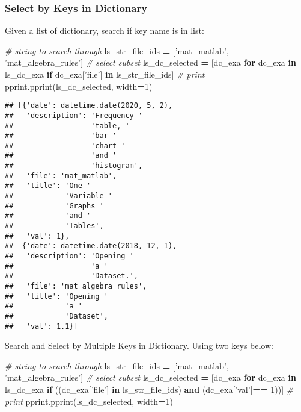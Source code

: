 \documentclass[
]{book}
\newenvironment{Shaded}{\begin{snugshade}}{\end{snugshade}}
\newcommand{\CommentTok}[1]{\textcolor[rgb]{0.56,0.35,0.01}{\textit{#1}}}
\newcommand{\ControlFlowTok}[1]{\textcolor[rgb]{0.13,0.29,0.53}{\textbf{#1}}}
\newcommand{\DecValTok}[1]{\textcolor[rgb]{0.00,0.00,0.81}{#1}}
\newcommand{\KeywordTok}[1]{\textcolor[rgb]{0.13,0.29,0.53}{\textbf{#1}}}
\newcommand{\NormalTok}[1]{#1}
\newcommand{\OperatorTok}[1]{\textcolor[rgb]{0.81,0.36,0.00}{\textbf{#1}}}
\newcommand{\StringTok}[1]{\textcolor[rgb]{0.31,0.60,0.02}{#1}}
\begin{document}
\hypertarget{select-by-keys-in-dictionary}{%
\subsubsection{Select by Keys in Dictionary}\label{select-by-keys-in-dictionary}}

Given a list of dictionary, search if key name is in list:

\begin{Shaded}
\begin{Highlighting}[]
\CommentTok{# string to search through}
\NormalTok{ls_str_file_ids }\OperatorTok{=}\NormalTok{ [}\StringTok{'mat_matlab'}\NormalTok{, }\StringTok{'mat_algebra_rules'}\NormalTok{]}
\CommentTok{# select subset}
\NormalTok{ls_dc_selected }\OperatorTok{=}\NormalTok{ [dc_exa}
                  \ControlFlowTok{for}\NormalTok{ dc_exa }\KeywordTok{in}\NormalTok{ ls_dc_exa}
                  \ControlFlowTok{if}\NormalTok{ dc_exa[}\StringTok{'file'}\NormalTok{] }\KeywordTok{in}\NormalTok{ ls_str_file_ids]}
\CommentTok{# print}
\NormalTok{pprint.pprint(ls_dc_selected, width}\OperatorTok{=}\DecValTok{1}\NormalTok{)}
\end{Highlighting}
\end{Shaded}

\begin{verbatim}
## [{'date': datetime.date(2020, 5, 2),
##   'description': 'Frequency '
##                  'table, '
##                  'bar '
##                  'chart '
##                  'and '
##                  'histogram',
##   'file': 'mat_matlab',
##   'title': 'One '
##            'Variable '
##            'Graphs '
##            'and '
##            'Tables',
##   'val': 1},
##  {'date': datetime.date(2018, 12, 1),
##   'description': 'Opening '
##                  'a '
##                  'Dataset.',
##   'file': 'mat_algebra_rules',
##   'title': 'Opening '
##            'a '
##            'Dataset',
##   'val': 1.1}]
\end{verbatim}

Search and Select by Multiple Keys in Dictionary. Using two keys below:

\begin{Shaded}
\begin{Highlighting}[]
\CommentTok{# string to search through}
\NormalTok{ls_str_file_ids }\OperatorTok{=}\NormalTok{ [}\StringTok{'mat_matlab'}\NormalTok{, }\StringTok{'mat_algebra_rules'}\NormalTok{]}
\CommentTok{# select subset}
\NormalTok{ls_dc_selected }\OperatorTok{=}\NormalTok{ [dc_exa}
                  \ControlFlowTok{for}\NormalTok{ dc_exa }\KeywordTok{in}\NormalTok{ ls_dc_exa}
                  \ControlFlowTok{if}\NormalTok{ ((dc_exa[}\StringTok{'file'}\NormalTok{] }\KeywordTok{in}\NormalTok{ ls_str_file_ids) }
                      \KeywordTok{and}
\NormalTok{                      (dc_exa[}\StringTok{'val'}\NormalTok{]}\OperatorTok{==} \DecValTok{1}\NormalTok{))]}
\CommentTok{# print}
\NormalTok{pprint.pprint(ls_dc_selected, width}\OperatorTok{=}\DecValTok{1}\NormalTok{)}
\end{Highlighting}
\end{Shaded}
\end{document}
